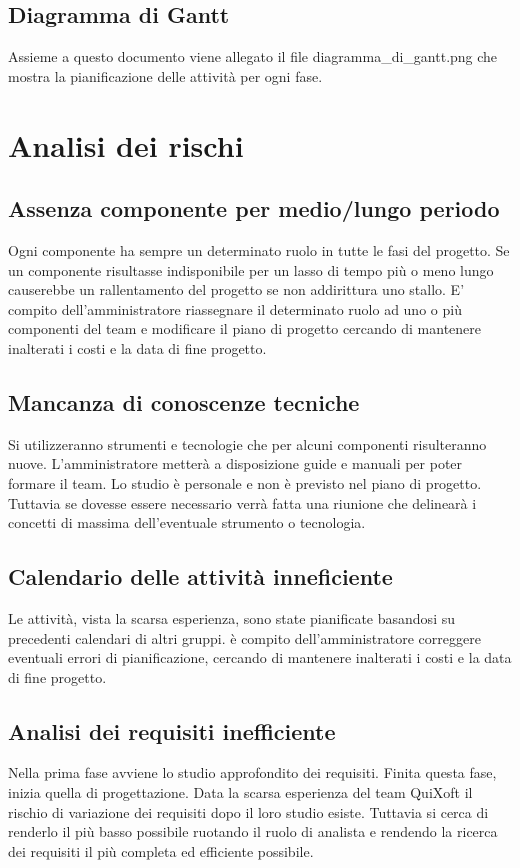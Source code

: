 \documentclass[11pt,a4paper]{article}
\begin{document}
\subsection{Diagramma di Gantt}
Assieme a questo documento viene allegato il file diagramma\_di\_gantt.png che mostra la pianificazione delle attività per ogni fase. 

\section{Analisi dei rischi}
\subsection{Assenza componente per medio/lungo periodo}
Ogni componente ha sempre un determinato ruolo in tutte le fasi del progetto.
Se un componente risultasse indisponibile per un lasso di tempo più o meno lungo causerebbe un rallentamento del progetto se non addirittura uno stallo.
E' compito dell'amministratore riassegnare il determinato ruolo ad uno o più componenti del team e modificare il piano di progetto cercando di mantenere inalterati i costi e la data di fine progetto.
\subsection{Mancanza di conoscenze tecniche}
Si utilizzeranno strumenti e tecnologie che per alcuni componenti risulteranno nuove.
L'amministratore metterà a disposizione guide e manuali per poter formare il team. Lo studio è personale e non è previsto nel piano di progetto. Tuttavia se dovesse essere necessario verrà fatta una riunione che delinearà i concetti di massima dell'eventuale strumento o tecnologia.
\subsection{Calendario delle attività inneficiente}
Le attività, vista la scarsa esperienza, sono state pianificate basandosi su precedenti calendari di altri gruppi.
è compito dell'amministratore correggere eventuali errori di pianificazione, cercando di mantenere inalterati i costi e la data di fine progetto.
\subsection{Analisi dei requisiti inefficiente}
Nella prima fase avviene lo studio approfondito dei requisiti. Finita questa fase, inizia quella di progettazione. Data la scarsa esperienza del team QuiXoft il rischio di variazione dei requisiti dopo il loro studio esiste. Tuttavia si cerca di renderlo il più basso possibile ruotando il ruolo di analista e rendendo la ricerca dei requisiti il più completa ed efficiente possibile. 
\end{document}
